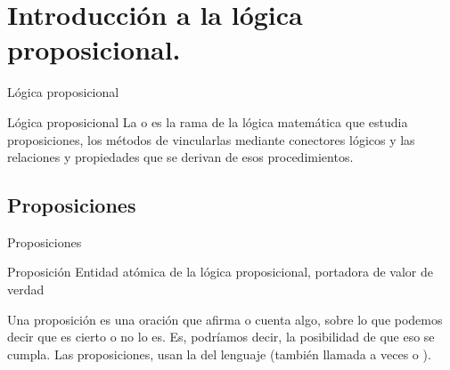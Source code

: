 
\section{Introducción a la lógica proposicional.}


\begin{frame}{Lógica proposicional}
  \begin{block}{Lógica proposicional}
    La  o  es la
    rama de la lógica matemática que estudia proposiciones, los métodos de
    vincularlas mediante conectores lógicos y las relaciones y propiedades
    que se derivan de esos procedimientos.
  \end{block}
\end{frame}


\subsection{Proposiciones}


\begin{frame}{Proposiciones}
  \begin{block}{Proposición}
    Entidad atómica de la lógica proposicional, portadora de valor de verdad
  \end{block}
  \jump
  Una proposición es una oración que afirma o cuenta algo, sobre lo que podemos
  decir que es cierto o no lo es.
  \jump
  Es, podríamos decir, la posibilidad de que eso se cumpla.
  \jump
  Las proposiciones, usan la  del lenguaje
  (también llamada a veces  o ).
\end{frame}


